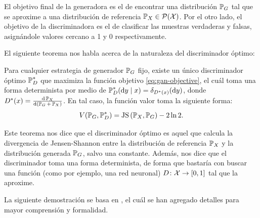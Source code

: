 {{El objetivo final de la generadora es el de encontrar una distribución $\Prob_G$ tal que se aproxime a una distribución de referencia $\Prob_X \in \ProbSpace[\cX] $. Por el otro lado, el objetivo de la discriminadora es el de clasificar las muestras verdaderas y falsas, asignándole valores cercano a 1 y 0 respectivamente.


El siguiente teorema nos habla acerca de la naturaleza del discriminador óptimo:

\begin{theorem}
    \label{thm:gan-optimal-discriminator}
    Para cualquier estrategia de generador $\Prob_G$ fijo, existe un único discriminador óptimo $\Prob_D^\ast$ que maximiza la función objetivo \eqref{eq:gan-objective}, el cuál toma una forma determinista por medio de $\Prob_D^\ast(\dd y \mid x) = \delta_{D^\ast(x)}(\dd y)$, donde $D^\ast(x) = \dv{\Prob_X}{(\Prob_G+\Prob_X)}$. En tal caso, la función valor toma la siguiente forma:
    \begin{equation}
        V(\Prob_G, \Prob_D^\ast) = \JS{\Prob_X}{\Prob_G} - 2 \ln 2.
    \end{equation}
\end{theorem}

Este teorema nos dice que el discriminador óptimo es aquel que calcula la divergencia de Jensen-Shannon entre la distribución de referencia $\Prob_X$ y la distribución generada $\Prob_G$, salvo una constante. Además, nos dice que el discriminador toma una forma determinista, de forma que bastaría con buscar una función (como por ejemplo, una red neuronal) $D\colon\mathcal{X}\to [0, 1]$ tal que la aproxime.

La siguiente demostración se basa en \cite{wikipediagan}, el cuál se han agregado detalles para mayor comprensión y formalidad.

}}
